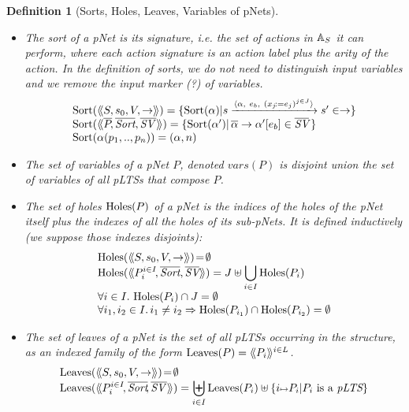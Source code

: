 \documentclass{lmcs}
\newtheorem{definition}{Definition}
\begin{document}
\begin{definition}[Sorts, Holes, Leaves, Variables of pNets]\label{def-sortholeleave}~~

  \begin{itemize}
  \item The sort of a pNet is its signature, i.e. the set of actions in $\mathbb{A}_S$ it can
perform, where each action signature is an action 
label plus the arity of the action. In the definition of sorts, we do not need to 
distinguish
input variables and we remove the
\emph{input marker} (?) of variables.
\[
\begin{array}{l}
\Sortop(\mylangle S,s_0,V, \to\myrangle) = \{\Sortop(\alpha)|s \xrightarrow{\langle \alpha,~e_b,~(x_j\!:= {e}_j)^{j\in
    J}\rangle} s'\in \to \} \\
\Sortop(\mylangle \set{\pNet}\!, %
\set{\Sort},
\set{\symb{SV}\,}\myrangle)
=\{\Sortop(\alpha') |\, \SV{\set{\alpha}}{\alpha'}{e_b}\in\set{\symb{SV}}\,\}\\
\Sortop(\alpha(p_1,..,p_n))=(\alpha,n)
\end{array}
\]

\item The set of variables of a pNet $P$, denoted $vars(P)$ is disjoint union the set of variables of  all pLTSs that compose $P$.

\item
The set of holes $\operatorname{Holes}(P)$ of a pNet is the indices of the holes of the pNet 
itself plus the indexes of all the holes of its sub-pNets.
It is defined inductively (we suppose those indexes 
disjoints):
  \[\begin{array}{l}
\Holes(\mylangle S,s_0,V, \to\myrangle) \!=\! \emptyset\\
\Holes(\mylangle \pNet_i^{i\in I}\!,\set{\Sort}, \set{\symb{SV}}\myrangle) 
=J\uplus{\displaystyle \bigcup_{i\in 
I}\Holes(\pNet_i)}\\
\forall i\in I.\, \Holes(\pNet_i)\cap J=\emptyset\\
\forall i_1,i_2\in I.\,i_1\neq i_2\Rightarrow  \Holes(\pNet_{i_1})\cap\Holes(\pNet_{i_2})=\emptyset
\end{array}\]

\item
The set of leaves of a pNet is the set of all pLTSs occurring in the structure, as an 
indexed family of the form $\operatorname{Leaves}(P)= \langle\hspace{-0.45ex}\langle P_i \rangle\hspace{-0.45ex}\rangle^{i \in L}$.
\[\begin{array}{l}
\Leaves(\mylangle S,s_0,V, \to\myrangle) \!=\!\emptyset\\%
\Leaves(\mylangle \pNet_i^{i\in I}\!,%
\set{\Sort}\!, \set{\symb{SV}\,}\myrangle) = {\displaystyle \biguplus_{i\in 
I}\Leaves(\pNet_i)\uplus\{i\mapsto \pNet_i|\pNet_i \text{ is a }\pLTS\}}
\end{array}\]
\end{itemize}


\end{definition}
\end{document}
